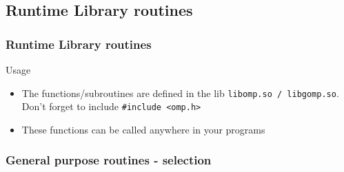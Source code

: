\subsection{Runtime Library routines}

\begin{frame}
\frametitle{Runtime Library routines}
\begin{exampleblock}{Usage}
\begin{itemize}
\item{The functions/subroutines are defined in the lib \texttt{libomp.so / libgomp.so}. Don't
    forget to include \texttt{\#include <omp.h>}}
\item{These functions can be called anywhere in your programs}
\end{itemize}
\end{exampleblock}
\end{frame}

\subsubsection{General purpose routines - selection}

%
%

